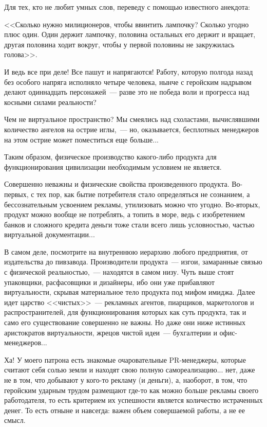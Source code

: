 \documentclass{scrbook}
\newcommand{\flqq}{<<}
\newcommand{\frqq}{>>}
\newcommand{\mdash}{~--- }
\newcommand{\commamdash}{~--- } %
\begin{document}
Для тех, кто не любит умных слов, переведу с помощью известного анекдота:

{\flqq}Сколько нужно милиционеров, чтобы ввинтить лампочку? Сколько угодно плюс один. Один держит лампочку, половина остальных его держит и вращает, другая половина ходит вокруг, чтобы у первой половины не закружилась голова{\frqq}.

И ведь все при деле! Все пашут и напрягаются! Работу, которую полгода назад без особого напряга исполняло четыре человека, нынче с геройским надрывом делают одиннадцать персонажей{\mdash}разве это не победа воли и прогресса над косными силами реальности?

Чем не виртуальное пространство? Мы смеялись над схоластами, вычислявшими количество ангелов на острие иглы,{\commamdash}но, оказывается, бесплотных менеджеров на этом острие может поместиться еще больше...

Таким образом, физическое производство какого-либо продукта для функционирования цивилизации необходимым условием не является.

Совершенно неважны и физические свойства произведенного продукта. Во-первых, с тех пор, как бытие потребителя стало определяться не сознанием, а бессознательным усвоением рекламы, утилизовать можно что угодно. Во-вторых, продукт можно вообще не потреблять, а топить в море, ведь с изобретением банков и сложного кредита деньги тоже стали всего лишь условностью, частью виртуальной документации...

В самом деле, посмотрите на внутреннюю иерархию любого предприятия, от издательства до пивзавода. Производители продукта{\mdash}изгои, замаранные связью с физической реальностью,{\commamdash}находятся в самом низу. Чуть выше стоят упаковщики, расфасовщики и дизайнеры, ибо они уже прибавляют виртуальности, скрывая материальное тело продукта под мифом имиджа. Далее идет царство {\flqq}чистых{\frqq}{\mdash}рекламных агентов, пиарщиков, маркетологов и распространителей, для функционирования которых как суть продукта, так и само его существование совершенно не важны. Но даже они ниже истинных аристократов виртуальности, жрецов чистой идеи{\mdash}бухгалтерии и офис-менеджеров...

Ха! У моего патрона есть знакомые очаровательные PR-менеджеры, которые считают себя солью земли и находят свою полную самореализацию... нет, даже не в том, что добывают у кого-то рекламу (и деньги), а, наоборот, в том, что геройским ударным трудом размещают где-то как можно больше рекламы своего работодателя, то есть критерием их успешности является количество истраченных денег. То есть отныне и навсегда: важен объем совершаемой работы, а не ее смысл.
\end{document}
